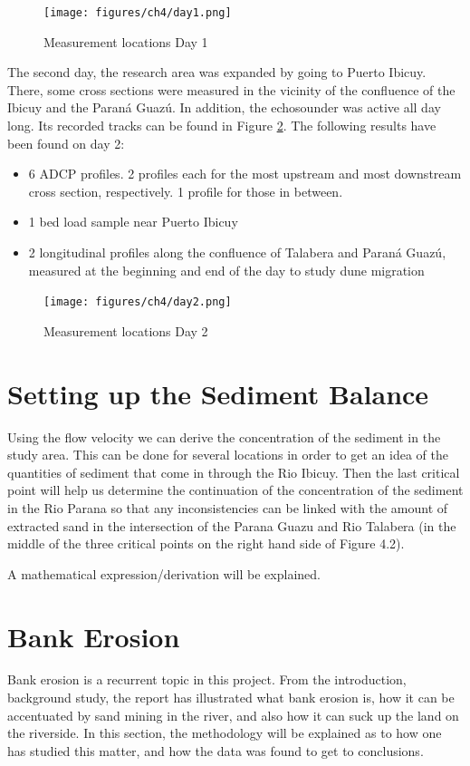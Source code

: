 \begin{figure}[H]
    \centering
    \texttt{[image: figures/ch4/day1.png]}
    \caption{Measurement locations Day 1}
    \label{fig:measurements day1}
\end{figure}

The second day, the research area was expanded by going to Puerto Ibicuy. There, some cross sections were measured in the vicinity of the confluence of the Ibicuy and the Paraná Guazú. In addition, the echosounder was active all day long. Its recorded tracks can be found in Figure \ref{fig:measurements day2}. The following results have been found on day 2:
\begin{itemize}
    \item 6 ADCP profiles. 2 profiles each for the most upstream and most downstream cross section, respectively. 1 profile for those in between. 
    \item 1 bed load sample near Puerto Ibicuy
    \item 2 longitudinal profiles along the confluence of Talabera and Paraná Guazú, measured at the beginning and end of the day to study dune migration
\end{itemize}

\begin{figure}[H]
    \centering
    \texttt{[image: figures/ch4/day2.png]}
    \caption{Measurement locations Day 2}
    \label{fig:measurements day2}
\end{figure}



\section{Setting up the Sediment Balance}
Using the flow velocity we can derive the concentration of the sediment in the study area. This can be done for several locations in order to get an idea of the quantities of sediment that come in through the Rio Ibicuy. Then the last critical point will help us determine the continuation of the concentration of the sediment in the Rio Parana so that any inconsistencies can be linked with the amount of extracted sand in the intersection of the Parana Guazu and Rio Talabera (in the middle of the three critical points on the right hand side of Figure 4.2).

A mathematical expression/derivation will be explained.

\section{Bank Erosion}
Bank erosion is a recurrent topic in this project. From the introduction, background study, the report has illustrated what bank erosion is, how it can be accentuated by sand mining in the river, and also how it can suck up the land on the riverside. 
In this section, the methodology will be explained as to how one has studied this matter, and how the data was found to get to conclusions.

